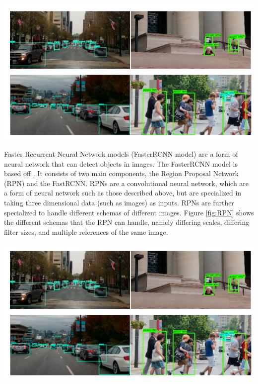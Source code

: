 \documentclass[man]{apa7}
\begin{document}
\begin{minipage}{\linewidth}
  \includegraphics[height=\textheight/4 ,width=\textwidth/2]{figures/detectionExample.png}
  \label{fig:exampleDetection}
\end{minipage}

Faster Recurrent Neural Network models (FasterRCNN model) are a form of neural network that can detect objects in images. The FasterRCNN model is based off \textcite{fasterRCNN}. It consists of two main components, the Region Proposal Network (RPN) and the FastRCNN. RPNs are a convolutional neural network, which are a form of neural network such as those described above, but are specialized in taking three dimensional data (such as images) as inputs. RPNs are further specialized to handle different schemas of different images. Figure \ref{fig:RPN} shows the different schemas that the RPN can handle, namely differing scales, differing filter sizes, and multiple references of the same image. 

\begin{minipage}{\linewidth}
  \includegraphics[height=\textheight/4 ,width=\textwidth/2]{figures/detectionExample.png}
  \label{fig:RPN}
\end{minipage}
\end{document}
